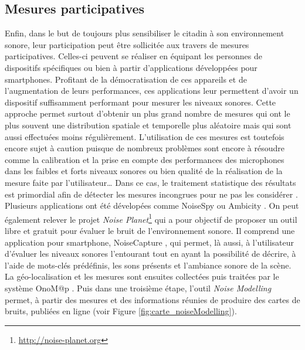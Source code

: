 \subsection{Mesures participatives}
Enfin, dans le but de toujours plus sensibiliser le citadin à son environnement sonore, leur participation peut être sollicitée aux travers de mesures participatives. Celles-ci peuvent se réaliser en équipant les personnes de dispositifs spécifiques \cite{aumond2017study} ou bien à partir d'applications développées pour smartphones. Profitant de la démocratisation de ces appareils et de l'augmentation de leurs performances, ces applications leur permettent d'avoir un dispositif suffisamment performant pour mesurer les niveaux sonores. Cette approche permet surtout d'obtenir un plus grand nombre de mesures qui ont le plus souvent une distribution spatiale et temporelle plus aléatoire mais qui sont aussi effectuées moins régulièrement. L'utilisation de ces mesures est toutefois encore sujet à caution puisque de nombreux problèmes sont encore à résoudre comme la calibration et la prise en compte des performances des microphones dans les faibles et forts niveaux sonores ou bien qualité de la réalisation de la mesure faite par l'utilisateur\dots{} Dans ce cas, le traitement statistique des résultats est primordial afin de détecter les mesures incongrues pour ne pas les considérer \cite{guillaume2016noise}. Plusieurs applications ont été dévelopées comme NoiseSpy \cite{kanjo_noisespy_2010} ou Ambicity \cite{ventura2017estimation}. On peut également relever le projet \textit{Noise Planet}\footnote{\url{http://noise-planet.org}} qui a pour objectif de proposer un outil libre et gratuit pour évaluer le bruit de l'environnement sonore. Il comprend une application pour smartphone, NoiseCapture \cite{guillaume2016noise}, qui permet, là aussi, à l'utilisateur d'évaluer les niveaux sonores l'entourant tout en ayant la possibilité de décrire, à l'aide de mots-clés prédéfinis, les sons présents et l'ambiance sonore de la scène. La géo-localisation et les mesures sont ensuites collectées puis traitées par le système OnoM@p \cite{bocher_onomp_2016}. Puis dans une troisième étape, l'outil \textit{Noise Modelling} permet, à partir des mesures et des informations réunies de produire des cartes de bruits, publiées en ligne (voir Figure \ref{fig:carte_noiseModelling}).\\ 

